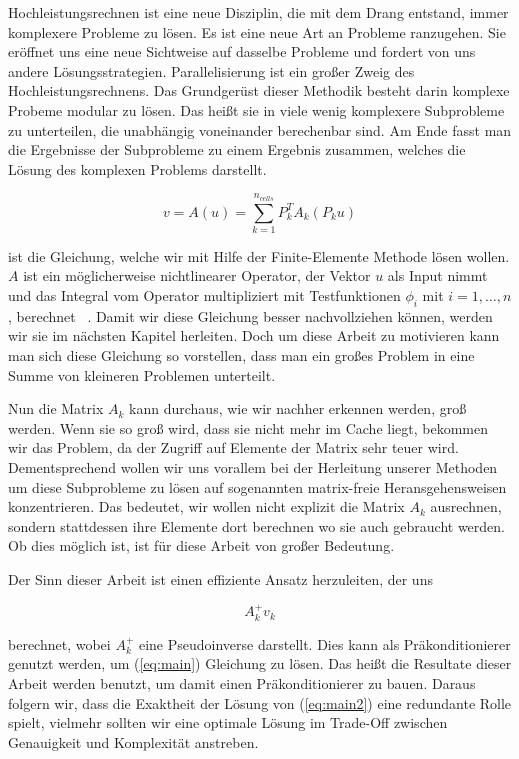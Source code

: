 Hochleistungsrechnen ist eine neue Disziplin, die mit dem Drang entstand, immer komplexere Probleme zu lösen. Es ist eine neue Art an Probleme ranzugehen. Sie eröffnet uns eine neue Sichtweise auf dasselbe Probleme und fordert von uns andere Lösungsstrategien.
Parallelisierung ist ein großer Zweig des Hochleistungsrechnens. Das Grundgerüst dieser Methodik besteht darin komplexe Probeme modular zu lösen. Das heißt sie in viele wenig komplexere Subprobleme zu unterteilen, die unabhängig voneinander berechenbar sind. Am Ende fasst man die Ergebnisse der Subprobleme zu einem Ergebnis zusammen, welches die Lösung des komplexen Problems darstellt.

\begin{equation} \label{eq:main}
v=A(u)=\sum_{k=1}^{n_{cells}}  P_k^T A_k (P_k u)
\end{equation}

ist die Gleichung, welche wir mit Hilfe der Finite-Elemente Methode lösen wollen. $A$ ist ein möglicherweise nichtlinearer Operator, der Vektor $u$ als Input nimmt und das Integral vom Operator multipliziert mit  Testfunktionen $\phi_i$ mit $i=1,\dots,n$, berechnet ~\cite[136]{Kronbichler}. Damit wir diese Gleichung besser nachvollziehen können, werden wir sie im nächsten Kapitel herleiten. Doch um diese Arbeit zu motivieren kann man sich diese Gleichung so vorstellen, dass man ein großes Problem in eine Summe von kleineren Problemen unterteilt. 

Nun die Matrix $A_k$ kann durchaus, wie wir nachher erkennen werden, groß werden. Wenn sie so groß wird, dass sie nicht mehr im Cache liegt, bekommen wir das Problem, da der Zugriff auf Elemente der Matrix sehr teuer wird. Dementsprechend wollen wir uns vorallem bei der Herleitung unserer Methoden um diese Subprobleme zu lösen auf sogenannten matrix-freie Heransgehensweisen konzentrieren. Das bedeutet, wir wollen nicht explizit die Matrix $A_k$ ausrechnen, sondern stattdessen ihre Elemente dort berechnen wo sie auch gebraucht werden. Ob dies möglich ist, ist für diese Arbeit von großer Bedeutung. 

Der Sinn dieser Arbeit ist einen effiziente Ansatz herzuleiten, der uns 

\begin{equation} \label{eq:main2}
A_k^{+}v_k
\end{equation}

berechnet, wobei $A_k^{+}$ eine Pseudoinverse darstellt. Dies kann als Präkonditionierer genutzt werden, um (\ref{eq:main}) Gleichung zu lösen. Das heißt die Resultate dieser Arbeit werden benutzt, um damit einen Präkonditionierer zu bauen. Daraus folgern wir, dass die Exaktheit der Lösung von (\ref{eq:main2}) eine redundante Rolle spielt, vielmehr sollten wir eine optimale Lösung im Trade-Off zwischen Genauigkeit und Komplexität anstreben.

